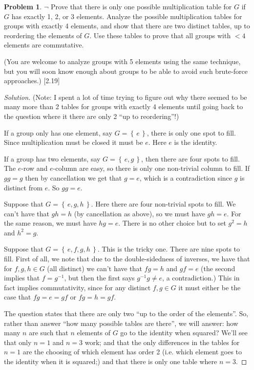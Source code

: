 \documentclass[fontsize=14pt]{scrartcl}
\theoremstyle{definition}
\newtheorem{problem-internal}{Problem}[subsection]
\newenvironment{problem}{
  \medskip
  \begin{problem-internal}
}{
  \end{problem-internal}
}
\newenvironment{solution}{
  \begin{proof}[Solution]
  \vspace{-8px}
  \setlength{\parskip}{4px}
  \setlength{\parindent}{0px}
}{
  \end{proof}
}
\newcommand{\set}[1]{\left\{\,#1\,\right\}}
\newcommand{\inv}[1]{#1^{-1}}
\begin{document}
\begin{problem}
$\neg$ Prove that there is only one possible multiplication table for $G$ if $G$
has exactly 1, 2, or 3 elements. Analyze the possible multiplication tables for
groups with exactly 4 elements, and show that there are two distinct tables, up
to reordering the elements of $G$. Use these tables to prove that all groups
with $< 4$ elements are commutative.

(You are welcome to analyze groups with 5 elements using the same technique, but
you will soon know enough about groups to be able to avoid such brute-force
approaches.) [2.19]
\end{problem}
\begin{solution}
(Note: I spent a lot of time trying to figure out why there seemed to be many
more than 2 tables for groups with exactly 4 elements until going back to the
question where it there are only 2 ``up to reordering''!)

If a group only has one element, say $G=\set{e}$, there is only one spot to fill.
Since multiplication must be closed it must be $e$. Here $e$ is the identity.

If a group has two elements, say $G=\set{e,g}$, then there are four spots to
fill. The $e$-row and $e$-column are easy, so there is only one non-trivial
column to fill. If $gg=g$ then by cancellation we get that $g=e$, which is a
contradiction since $g$ is distinct from $e$. So $gg=e$.

Suppose that $G=\set{e,g,h}$. Here there are four non-trivial spots to fill.  We
can't have that $gh=h$ (by cancellation as above), so we must have $gh=e$. For
the same reason, we must have $hg=e$. There is no other choice but to set
$g^2=h$ and $h^2=g$.

Suppose that $G=\set{e,f,g,h}$. This is the tricky one. There are nine spots to
fill. First of all, we note that due to the double-sidedness of inverses, we
have that for $f,g,h\in G$ (all distinct) we can't have that $fg=h$ and $gf=e$
(the second implies that $f=\inv{g}$, but then the first says $\inv{g}{g}\neq
e$, a contradiction.) This in fact implies commutativity, since for any distinct
$f,g\in G$ it must either be the case that $fg=e=gf$ or $fg=h=gf$.

The question states that there are only two ``up to the order of the elements''.
So, rather than answer ``how many possible tables are there'', we will answer:
how many $n$ are such that $n$ elements of $G$ go to the identity when squared?
We'll see that only $n=1$ and $n=3$ work; and that the only differences in the
tables for $n=1$ are the choosing of which element has order 2 (i.e. which
element goes to the identity when it is squared;) and that there is only one
table where $n=3$.


\end{solution}
\end{document}
